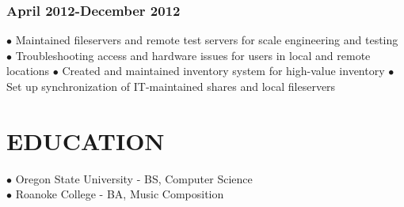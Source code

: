 \documentclass{article}
\begin{document}
\subsubsection*{April 2012-December 2012}

$\bullet$ Maintained fileservers and remote test servers for scale engineering and testing
$\bullet$ Troubleshooting access and hardware issues for users in local and remote locations
$\bullet$ Created and maintained inventory system for high-value inventory
$\bullet$ Set up synchronization of IT-maintained shares and local fileservers

\section*{EDUCATION}

$\bullet$ Oregon State University - BS, Computer Science\\
$\bullet$ Roanoke College - BA, Music Composition\\
\end{document}
